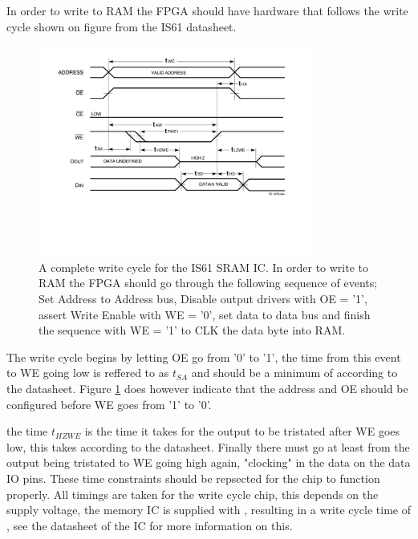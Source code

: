 In order to write to RAM the FPGA should have hardware that follows the write cycle shown on figure  from the IS61 datasheet.
\begin{figure}[H]
    \centering
    \includegraphics[clip, trim=0 150 0 0, width=0.8\textwidth]{Sections/7_SystemDesign/Figures/7_2_5_IS61_WriteCycle.pdf}
    \caption{A complete write cycle for the IS61 SRAM IC\cite{ISSISRAM}. In order to write to RAM the FPGA should go through the following sequence of events; Set Address to Address bus, Disable output drivers with OE = '1', assert Write Enable with WE = '0', set data to data bus and finish the sequence with WE = '1' to CLK the data byte into RAM.}
    \label{fig:7_2_5_IS61_WRITE}
\end{figure}

The write cycle begins by letting OE go from '0' to '1', the time from this event to WE going low is reffered to as $t_{SA}$ and should be a minimum of  according to the datasheet. Figure \ref{fig:7_2_5_IS61_WRITE} does however indicate that the address and OE should be configured before WE goes from '1' to '0'.

the time $t_{HZWE}$ is the time it takes for the output to be tristated after WE goes low, this takes  according to the datasheet. Finally there must go at least  from the output being tristated to WE going high again, "clocking" in the data on the data IO pins. These time constraints should be repsected for the chip to function properly. All timings are taken for the  write cycle chip, this depends on the supply voltage, the memory IC is supplied with , resulting in a write cycle time of , see the datasheet of the IC for more information on this.

